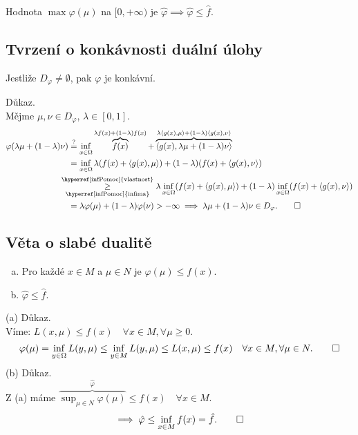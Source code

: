 Hodnota $\max \varphi(\mu)$ na $[0, +\infty)$ je $\hat \varphi \implies \hat \varphi \leq \hat f$.

\subsection{Tvrzení o konkávnosti duální úlohy}
Jestliže $D_\varphi \not= \emptyset$, pak $\varphi$ je konkávní.

Důkaz.\\
Mějme $\mu, \nu \in D_\varphi$, $\lambda \in [0,1]$.
\begin{align*}
    \varphi(\lambda \mu + (1-\lambda)\nu) &\overset{\text{?}}{=} \inf_{x\in \Omega} \overbrace{f(x)}^{\lambda f(x) + 
    (1-\lambda)f(x)} + \overbrace{\langle g(x), \lambda \mu + (1-\lambda)\nu\rangle}^{\lambda \langle g(x), \mu\rangle + 
    (1-\lambda)\langle g(x), \nu\rangle} \\
    &= \inf_{x\in \Omega} \lambda(f(x) + \langle g(x), \mu\rangle) + (1-\lambda)(f(x)+\langle g(x), \nu\rangle) \\
    &\hspace*{-1.1em}\underset{\text{\hyperref[infPomoc]{infima}}}{\overset{\text{\hyperref[infPomoc]{vlastnost}}}{\geq}} 
    \lambda \inf_{x\in \Omega} (f(x) + \langle g(x), \mu\rangle) + (1 - \lambda) \inf_{x\in \Omega} (f(x) + \langle g(x), 
    \nu\rangle) \\
    &= \lambda \varphi(\mu) + (1-\lambda) \varphi(\nu) > - \infty \implies \lambda \mu + (1-\lambda)\nu \in D_\varphi. \qed
\end{align*}

\subsection{Věta o slabé dualitě}\label{slabDual}
\begin{enumerate}[(a)]
    \item Pro každé $x \in M$ a $\mu \in N$ je $\varphi(\mu) \leq f(x)$.
    \item $\hat \varphi \leq \hat f$.
\end{enumerate}
(a) Důkaz.\\
Víme: $L(x, \mu) \leq f(x) \quad \forall x \in M, \forall \mu \geq 0$.
\[
    \varphi(\mu) = \inf_{y \in \Omega} L(y, \mu) \leq \inf_{y \in M} L(y, \mu) \leq L(x, \mu) \leq f(x) \quad 
    \forall x \in M, \forall \mu \in N. \qed
\]
(b) Důkaz.\\
Z (a) máme $\overbrace{\sup_{\mu \in N} \varphi(\mu)}^{\hat \varphi} \leq f(x) \quad \forall x \in M$.
\[
    \implies \hat \varphi \leq \inf_{x \in M}f(x) = \hat f. \qed
\]

